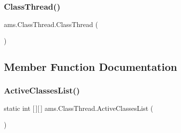 \subsubsection{\texorpdfstring{ClassThread()}{ClassThread()}}
{\footnotesize\ttfamily ams.\+Class\+Thread.\+Class\+Thread (\begin{DoxyParamCaption}{ }\end{DoxyParamCaption})}



\subsection{Member Function Documentation}
\mbox{\label{classams_1_1_class_thread_addadbfedff6d9cc822345caa787ad587}} 
\subsubsection{\texorpdfstring{ActiveClassesList()}{ActiveClassesList()}}
{\footnotesize\ttfamily static int \mbox{[}$\,$\mbox{]}\mbox{[}$\,$\mbox{]} ams.\+Class\+Thread.\+Active\+Classes\+List (\begin{DoxyParamCaption}{ }\end{DoxyParamCaption})\hspace{0.3cm}{\ttfamily [static]}}

